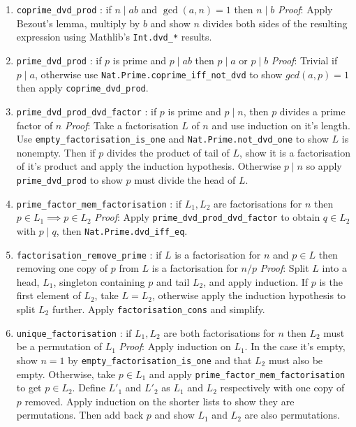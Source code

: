 \documentclass{article}
\begin{document}
\begin{enumerate}

\item \verb|coprime_dvd_prod| : if $n \mid ab$ and $\gcd(a, n) = 1$ then $n \mid b$
\newline \textit{Proof}: Apply Bezout's lemma, multiply by $b$ and show $n$ divides both sides
of the resulting expression using Mathlib's \verb|Int.dvd_*| results.

\item \verb|prime_dvd_prod| : if $p$ is prime and $p \mid ab$ then $p \mid a$ or $p \mid b$
\newline \textit{Proof}: Trivial if $p \mid a$, otherwise use \verb|Nat.Prime.coprime_iff_not_dvd| 
to show $gcd(a, p) = 1$ then apply \verb|coprime_dvd_prod|.

\item \verb|prime_dvd_prod_dvd_factor| : if $p$ is prime and $p \mid n$, then $p$ divides a prime 
factor of $n$
\newline \textit{Proof}: Take a factorisation $L$ of $n$ and use induction on it's length. 
Use \verb|empty_factorisation_is_one| and \verb|Nat.Prime.not_dvd_one| to show $L$ is nonempty. 
Then if $p$ divides the product of tail of $L$, show it is a factorisation of it's product and
apply the induction hypothesis. Otherwise $p \mid n$ so apply \verb|prime_dvd_prod| to show $p$
must divide the head of $L$.

\item \verb|prime_factor_mem_factorisation| : if $L_1, L_2$ are factorisations for $n$ then
$p\in L_1 \implies p\in L_2$
\newline \textit{Proof}: Apply \verb|prime_dvd_prod_dvd_factor| to obtain $q \in L_2$ with 
$p \mid q$, then \verb|Nat.Prime.dvd_iff_eq|.

\item \verb|factorisation_remove_prime| : if $L$ is a factorisation for $n$ and $p \in L$ then
removing one copy of $p$ from $L$ is a factorisation for $n/p$
\newline \textit{Proof}: Split $L$ into a head, $L_1$, singleton containing $p$ and tail $L_2$, 
and apply induction. If $p$ is the first element of $L_2$, take $L = L_2$, otherwise apply the 
induction hypothesis to split $L_2$ further. Apply \verb|factorisation_cons| and simplify.

\item \verb|unique_factorisation| : if $L_1, L_2$ are both factorisations for $n$ then $L_2$ must
be a permutation of $L_1$
\newline \textit{Proof}: Apply induction on $L_1$. In the case it's empty, show $n=1$ by 
\verb|empty_factorisation_is_one| and that $L_2$ must also be empty. Otherwise, take
$p \in L_1$ and apply \verb|prime_factor_mem_factorisation| to get $p \in L_2$. Define $L'_1$ and
$L'_2$ as $L_1$ and $L_2$ respectively with one copy of $p$ removed. Apply induction on the 
shorter lists to show they are permutations. Then add back $p$ and show $L_1$ and $L_2$ are also
permutations.

\end{enumerate}
\end{document}
